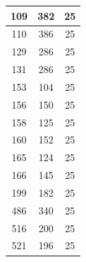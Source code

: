 \documentclass[12pt]{article}
\begin{document}
\begin{tabular}{|c|c|c|}
	\hline
	109& 382& 25 \\
	\hline
	110& 386& 25 \\
	\hline
	129& 286& 25 \\
	\hline
	131& 286& 25 \\
	\hline
	153& 104& 25 \\
	\hline
	156& 150& 25 \\
	\hline
	158& 125& 25 \\
	\hline
	160& 152& 25 \\
	\hline
	165& 124& 25 \\
	\hline
	166& 145& 25 \\
	\hline
	199& 182& 25 \\
	\hline
	486& 340& 25 \\
	\hline
	516& 200& 25 \\
	\hline
	521& 196& 25 \\
	\hline

\end{tabular}
\end{document}
